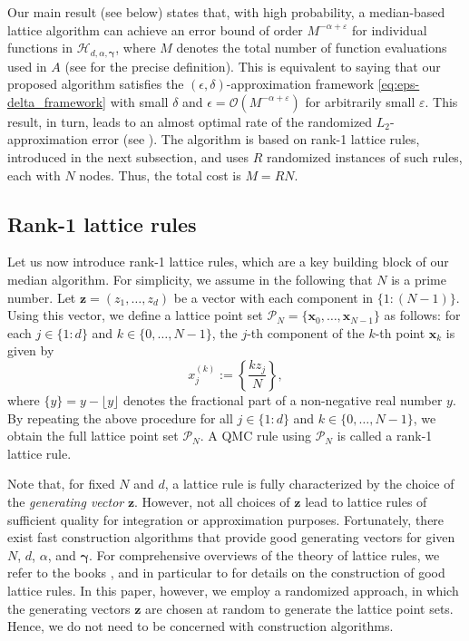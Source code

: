 \documentclass[pdflatex,sn-basic,Numbered]{sn-jnl}%
\newcommand{\bsx}{\boldsymbol{x}}
\newcommand{\bsz}{\boldsymbol{z}}
\newcommand{\bsgamma}{\boldsymbol{\gamma}}
\newcommand{\Hcal}{\mathcal{H}}
\newcommand{\Pcal}{\mathcal{P}}
\theoremstyle{thmstyleone}%
\theoremstyle{thmstyletwo}%
\begin{document}
Our main result (see  below) states that, with high probability, a median-based lattice algorithm can achieve an error bound of order $M^{-\alpha+\varepsilon}$ for individual functions in $\Hcal_{d,\alpha,\bsgamma}$, where $M$ denotes the total number of function evaluations used in $A$ (see  for the precise definition).
This is equivalent to saying that our proposed algorithm satisfies the $(\epsilon,\delta)$-approximation framework \eqref{eq:eps-delta_framework} with small $\delta$ and $\epsilon = \mathcal{O}(M^{-\alpha+\varepsilon})$ for arbitrarily small $\varepsilon$.
This result, in turn, leads to an almost optimal rate of the randomized $L_2$-approximation error (see ).
The algorithm is based on rank-1 lattice rules, introduced in the next subsection, and uses $R$ randomized instances of such rules, each with $N$ nodes. Thus, the total cost is $M = RN$.

\subsection{Rank-1 lattice rules}
Let us now introduce rank-1 lattice rules, which are a key building block of our median algorithm. For simplicity, we assume in the following that $N$ is a prime number. Let $\bsz=(z_1,\ldots,z_d)$ be a 
vector with each component in $\{1{:}(N-1)\}$. 
Using this vector, we define a lattice point set $\Pcal_N=\{\bsx_0,\ldots,\bsx_{N-1}\}$ as follows: 
for each $j\in\{1{:}d\}$ and $k\in\{0,\ldots,N-1\}$, the $j$-th component of the $k$-th point $\bsx_k$ is given by
\[
x_j^{(k)}:=\left\{\frac{k z_j}{N}\right\},
\]
where $\{y\}=y-\lfloor y \rfloor$ denotes the fractional part of a non-negative real number $y$. 
By repeating the above procedure for all $j\in\{1{:}d\}$ and $k\in\{0,\ldots,N-1\}$, we obtain the full lattice point set $\Pcal_N$. A QMC rule using $\Pcal_N$ is called a rank-1 lattice rule. 

Note that, for fixed $N$ and $d$, a lattice rule is fully characterized by the choice of the \textit{generating vector} $\bsz$. However, not all choices of $\bsz$ lead to lattice rules of sufficient quality for integration or approximation purposes. Fortunately, there exist fast construction algorithms that provide good generating vectors for given $N$, $d$, $\alpha$, and $\bsgamma$. For comprehensive overviews of the theory of lattice rules, we refer to the books \cite{dick2022lattice, sloan1994lattice}, and in particular to \cite[Chapters 3 and 4]{dick2022lattice} for details on the construction of good lattice rules. In this paper, however, we employ a randomized approach, in which the generating vectors $\bsz$ are chosen at random to generate the lattice point sets. Hence, we do not need to be concerned with construction algorithms. 
\end{document}
